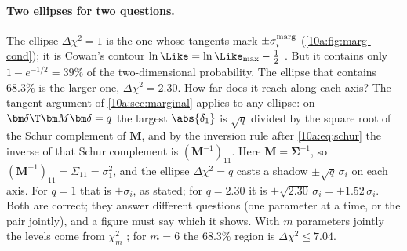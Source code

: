 \paragraph{Two ellipses for two questions.} The ellipse $\Delta\chi^2=1$ is the one whose tangents mark
$\pm\sigma_i^{\rm marg}$ (\cref{10a:fig:marg-cond}); it is Cowan's contour $\ln\Like=\ln\Like_{\max}-\frac12$
. But it contains only $1-e^{-1/2}=39\%$ of the two-dimensional probability. The
ellipse that contains $68.3\%$ is the larger one, $\Delta\chi^2=2.30$. How far does it reach along each axis?
The tangent argument of \cref{10a:sec:marginal} applies to any ellipse: on $\bm\delta\T\bm M\bm\delta=q$ the largest
$\abs{\delta_1}$ is $\sqrt q$ divided by the square root of the Schur complement of $\bm M$, and by the inversion
rule after \eqref{10a:eq:schur} the inverse of that Schur complement is $(\bm M^{-1})_{11}$. Here $\bm M=\bm\Sigma^{-1}$, so
$(\bm M^{-1})_{11}=\Sigma_{11}=\sigma_1^2$, and the ellipse $\Delta\chi^2=q$ casts a shadow $\pm\sqrt q\,\sigma_i$ on each axis.
For $q=1$ that is $\pm\sigma_i$, as stated; for $q=2.30$ it is $\pm\sqrt{2.30}\,\sigma_i=\pm1.52\,\sigma_i$. Both are correct; they answer different questions (one parameter at a time, or the pair
jointly), and a figure must say which it shows. With $m$ parameters jointly the levels come from $\chi^2_m$
; for $m=6$ the $68.3\%$ region is $\Delta\chi^2\le7.04$.

